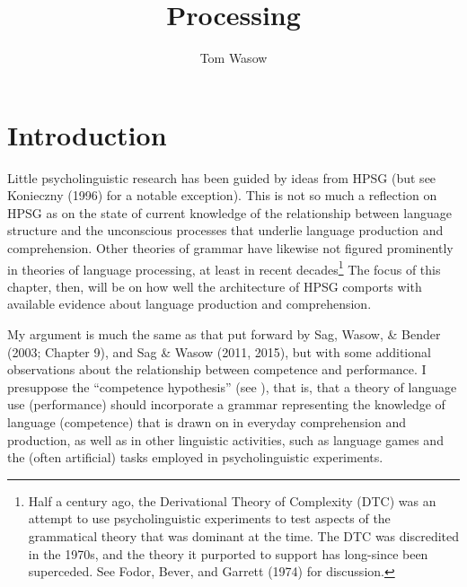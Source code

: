 \documentclass[a4paper]{article}
\title{Processing}
\author{Tom Wasow}
\begin{document}
\maketitle


\section{Introduction}

Little psycholinguistic research has been guided by ideas from HPSG (but see  Konieczny (1996) for a notable exception).  This is not so much a reflection on HPSG as on the state of current knowledge of the relationship between language structure and the unconscious processes that underlie language production and comprehension.  Other theories of grammar have likewise not figured prominently in theories of language processing, at least in recent decades\footnote{Half a century ago, the Derivational Theory of Complexity (DTC) was an attempt to use psycholinguistic experiments to test aspects of the grammatical theory that was dominant at the time.  The DTC was discredited in the 1970s, and the theory it purported to support has long-since been superceded.  See Fodor, Bever, and Garrett (1974) for discussion.}  The focus of this chapter, then, will be on how well the architecture of HPSG comports with available evidence about language production and comprehension.  

My argument is much the same as that put forward by Sag, Wasow, \& Bender (2003; Chapter 9), and Sag \& Wasow (2011, 2015), but with some additional observations about the relationship between competence and performance. I presuppose the ``competence hypothesis'' (see \citealt[Chapter~1]{Chomsky65a}), that is, that a theory of language use (performance) should incorporate a grammar representing the knowledge of language (competence) that is drawn on in everyday comprehension and production, as well as in other linguistic activities, such as language games and the (often artificial) tasks employed in psycholinguistic experiments.  
\end{document}
